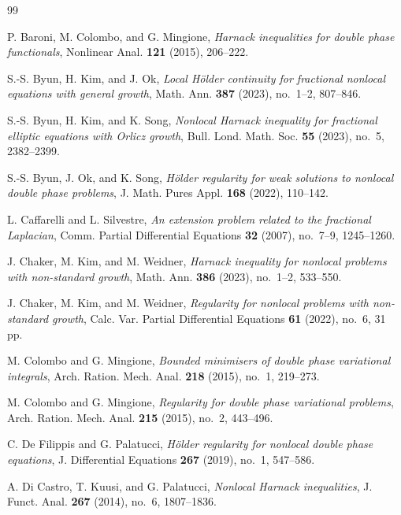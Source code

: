 \documentclass[reqno]{amsart}
\theoremstyle{plain}
\theoremstyle{definition}
\theoremstyle{remark}
\numberwithin{equation}{section}
\begin{document}
\begin{thebibliography}{99}
\enlargethispage{5\baselineskip}

P. Baroni, M. Colombo, and G. Mingione,
\emph{Harnack inequalities for double phase functionals},
Nonlinear Anal. \textbf{121} (2015), 206--222.



S.-S. Byun, H. Kim, and J. Ok,
\emph{Local H\"older continuity for fractional nonlocal equations with general growth},
Math. Ann. \textbf{387} (2023), no.~1--2, 807--846.


S.-S. Byun, H. Kim, and K. Song,
\emph{Nonlocal Harnack inequality for fractional elliptic equations with Orlicz growth},
Bull. Lond. Math. Soc. \textbf{55} (2023), no.~5, 2382--2399.


S.-S. Byun, J. Ok, and K. Song,
\emph{H\"older regularity for weak solutions to nonlocal double phase problems},
J. Math. Pures Appl. \textbf{168} (2022), 110--142.

L. Caffarelli and L. Silvestre,
\emph{An extension problem related to the fractional Laplacian},
Comm. Partial Differential Equations \textbf{32} (2007), no.~7--9, 1245--1260.

J. Chaker, M. Kim, and M. Weidner,
\emph{Harnack inequality for nonlocal problems with non-standard growth},
Math. Ann. \textbf{386} (2023), no.~1--2, 533--550.


J. Chaker, M. Kim, and M. Weidner,
\emph{Regularity for nonlocal problems with non-standard growth},
Calc. Var. Partial Differential Equations \textbf{61} (2022), no.~6, 31 pp.


M. Colombo and G. Mingione,
\emph{Bounded minimisers of double phase variational integrals},
Arch. Ration. Mech. Anal. \textbf{218} (2015), no.~1, 219--273.

M. Colombo and G. Mingione,
\emph{Regularity for double phase variational problems},
Arch. Ration. Mech. Anal. \textbf{215} (2015), no.~2, 443--496.

C. De Filippis and G. Palatucci,
\emph{H\"older regularity for nonlocal double phase equations},
J. Differential Equations \textbf{267} (2019), no.~1, 547--586.

A. Di Castro, T. Kuusi, and G. Palatucci,
\emph{Nonlocal Harnack inequalities},
J. Funct. Anal. \textbf{267} (2014), no.~6, 1807--1836.


\end{thebibliography}
\end{document}
